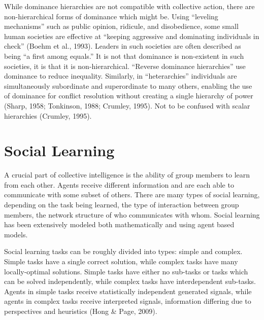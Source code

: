 While dominance hierarchies are not compatible with collective action, there are non-hierarchical forms of dominance which might be. Using “leveling mechanisms” such as public opinion, ridicule, and disobedience, some small human societies are effective at “keeping aggressive and dominating individuals in check” (Boehm et al., 1993). Leaders in such societies are often described as being “a first among equals.” It is not that dominance is non-existent in such societies, it is that it is non-hierarchical. “Reverse dominance hierarchies” use dominance to reduce inequality. Similarly, in “heterarchies” individuals are simultaneously subordinate and superordinate to many others, enabling the use of dominance for conflict resolution without creating a single hierarchy of power (Sharp, 1958; Tonkinson, 1988; Crumley, 1995). Not to be confused with scalar hierarchies (Crumley, 1995).

\section{Social Learning}
A crucial part of collective intelligence is the ability of group members to learn from each other. Agents receive different information and are each able to communicate with some subset of others. There are many types of social learning, depending on the task being learned, the type of interaction between group members, the network structure of who communicates with whom. Social learning has been extensively modeled both mathematically and using agent based models.

Social learning tasks can be roughly divided into types: simple and complex. Simple tasks have a single correct solution, while complex tasks have many locally-optimal solutions. Simple tasks have either no sub-tasks or tasks which can be solved independently, while complex tasks have interdependent sub-tasks. Agents in simple tasks receive statistically independent generated signals, while agents in complex tasks receive interpreted signals, information differing due to perspectives and heuristics (Hong \& Page, 2009).


